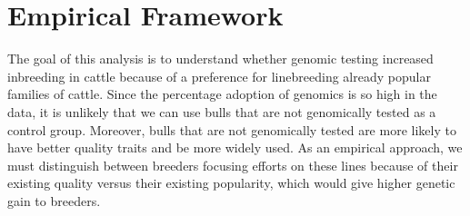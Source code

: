 \documentclass[12pt,letterpaper]{article}
\begin{document}









\section{Empirical Framework\label{sec:emp_frame}}
The goal of this analysis is to understand whether genomic testing increased inbreeding in cattle because of a preference for linebreeding already popular families of cattle.
Since the percentage adoption of genomics is so high in the data, it is unlikely that we can use bulls that are not genomically tested as a control group.
Moreover, bulls that are not genomically tested are more likely to have better quality traits and be more widely used.
As an empirical approach, we must distinguish between breeders focusing efforts on these lines because of their existing quality versus their existing popularity, which would give higher genetic gain to breeders.
\end{document}
